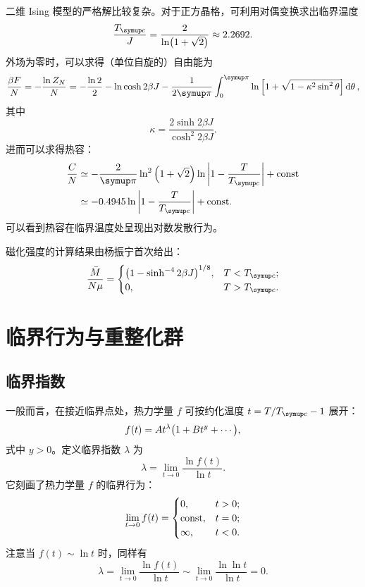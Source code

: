 二维 Ising 模型的严格解比较复杂。对于正方晶格，可利用对偶变换求出临界温度
\begin{equation}
  \label{eq:ising-Tc}
  \frac{\Tc}{J} = \frac{2}{\ln(1+\sqrt{2})} \approx \num{2.2692}.
\end{equation}
外场为零时，可以求得（单位自旋的）自由能为
\begin{equation}
  \frac{\beta F}{N}
  = - \frac{\ln Z_N}{N}
  = - \frac{\ln 2}{2} - \ln\cosh 2\beta J
    - \frac{1}{2\pp} \int_0^\pp \ln\qty[1+\sqrt{1-\kappa^2\sin^2\theta}] \dd{\theta},
\end{equation}
其中
\begin{equation}
  \kappa = \frac{2\sinh 2\beta J}{\cosh^2 2\beta J}.
\end{equation}
进而可以求得热容：
\begin{align}
  \label{eq:ising-specific-heat}
  \frac{C}{N}
  & \simeq -\frac{2}{\pp} \ln^2 \qty(1+\sqrt{2}) \ln\abs{1-\frac{T}{\Tc}} + \const \notag \\
  & \simeq \num{-0.4945} \ln\abs{1-\frac{T}{\Tc}} + \const.
\end{align}
可以看到热容在临界温度处呈现出对数发散行为。

磁化强度的计算结果由杨振宁首次给出：
\begin{equation}
  \label{eq:ising-magnetization}
  \frac{\bar{M}}{N\mu} =
  \begin{cases}
    \qty(1 - \sinh^{-4} 2\beta J)^{1/8}, & T<\Tc; \\
    0, & T>\Tc.
  \end{cases}
\end{equation}

\section{临界行为与重整化群}

\subsection{临界指数}

一般而言，在接近临界点处，热力学量 $f$ 可按约化温度 $t=T/\Tc-1$ 展开：
\begin{equation}
  f(t) = A t^\lambda \qty\big(1 + B t^y + \cdots),
\end{equation}
式中 $y>0$。定义临界指数 $\lambda$ 为
\begin{equation}
  \lambda = \lim_{t \to 0} \frac{\ln f(t)}{\ln t}.
\end{equation}
它刻画了热力学量 $f$ 的临界行为：
\begin{equation}
  \lim_{t \to 0} f(t) =
  \begin{cases}
    0,      & t > 0; \\
    \text{const}, & t = 0; \\
    \infty, & t < 0.
  \end{cases}
\end{equation}
注意当 $f(t) \sim \ln t$ 时，同样有
\begin{equation}
  \lambda =    \lim_{t \to 0} \frac{\ln f(t)}{\ln t}
          \sim \lim_{t \to 0} \frac{\ln \ln t}{\ln t} = 0.
\end{equation}

